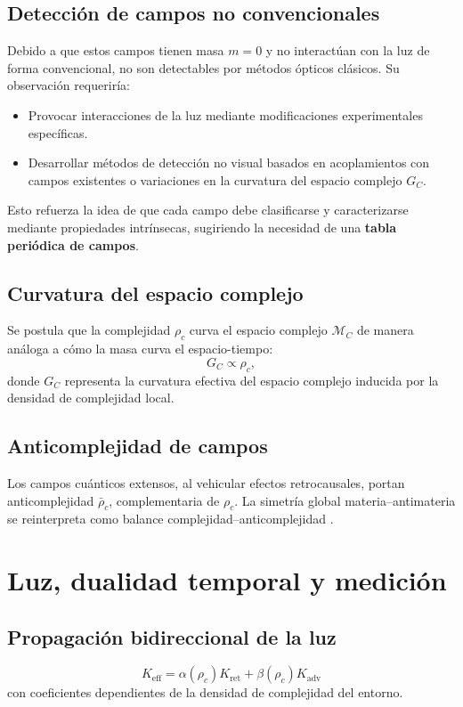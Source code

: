 \documentclass[reprint,amsmath,amssymb,aps]{revtex4-2}
\begin{document}
\subsection{Detección de campos no convencionales}
Debido a que estos campos tienen masa $m=0$ y no interactúan con la luz de forma convencional, no son detectables por métodos ópticos clásicos. Su observación requeriría: 
\begin{itemize}
    \item Provocar interacciones de la luz mediante modificaciones experimentales específicas.
    \item Desarrollar métodos de detección no visual basados en acoplamientos con campos existentes o variaciones en la curvatura del espacio complejo $G_C$.
\end{itemize}
Esto refuerza la idea de que cada campo debe clasificarse y caracterizarse mediante propiedades intrínsecas, sugiriendo la necesidad de una \textbf{tabla periódica de campos}.

\subsection{Curvatura del espacio complejo}
Se postula que la complejidad $\rho_c$ curva el espacio complejo $\mathcal{M}_C$ de manera análoga a cómo la masa curva el espacio-tiempo:
\begin{equation}
G_C \propto \rho_c,
\end{equation}
donde $G_C$ representa la curvatura efectiva del espacio complejo inducida por la densidad de complejidad local.

\subsection{Anticomplejidad de campos}
Los campos cuánticos extensos, al vehicular efectos retrocausales, portan anticomplejidad $\bar{\rho}_c$, complementaria de $\rho_c$. La simetría global materia–antimateria se reinterpreta como balance complejidad–anticomplejidad \cite{Susskind2018, Maldacena1998}.

\section{Luz, dualidad temporal y medición}
\subsection{Propagación bidireccional de la luz}
\begin{equation}
K_{\text{eff}} = \alpha(\rho_c) K_{\text{ret}} + \beta(\rho_c) K_{\text{adv}}
\end{equation}
con coeficientes dependientes de la densidad de complejidad del entorno.
\end{document}
